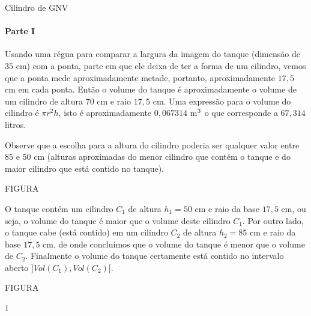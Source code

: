 \begin{answer}{Cilindro de GNV}
{
\paragraph{Parte I}  
Usando uma régua para comparar a largura da imagem do tanque (dimensão de $35$ cm) com a ponta, parte em que ele deixa de ter a forma de um cilindro, vemos que a ponta mede aproximadamente metade, portanto, aproximadamente $17{,}5$ cm em cada ponta. Então o volume do tanque é aproximadamente o volume de um cilindro de altura $70$ cm e raio $17{,}5$ cm. Uma expressão para o volume do cilindro é \(\pi r^2 h\), isto é aproximadamente $0{,}067314$ m\(\sp{3}\) o que corresponde a $67{,}314$ litros.

Observe que a escolha para a altura do cilindro poderia ser qualquer valor entre $85$ e $50$ cm (alturas aproximadas do menor cilindro que contém o tanque e do maior cilindro que está contido no tanque).

FIGURA

O tanque contém um cilindro \(C_1\) de altura \(h_1 = 50\text{ cm}\) e raio da base $17{,}5$ cm, ou seja, o volume do tanque é maior que o volume deste cilindro \(C_1\). Por outro lado, o tanque cabe (está contido) em um cilindro \(C_2\) de altura \(h_2 = 85\text{ cm}\) e raio da base \(17{,}5\) cm, de onde concluímos que o volume do tanque é menor que o volume de \(C_2\). Finalmente o volume do tanque certamente está contido no intervalo aberto 
$]Vol(C_1), Vol(C_2)[$.

FIGURA
}
{1}
\end{answer}

